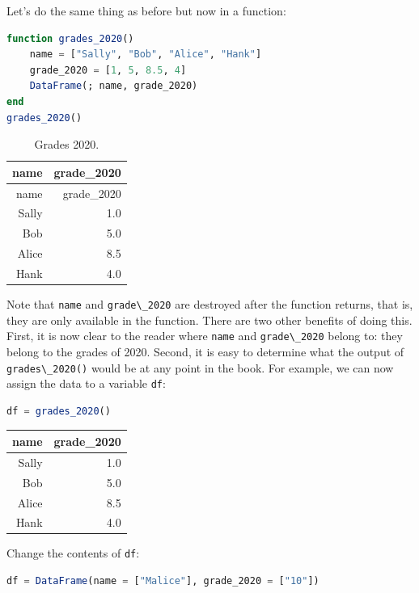 \documentclass[
  notoc %
]{tufte-book}
\newcommand{\passthrough}[1]{#1}
\begin{document}
Let's do the same thing as before but now in a function:

\begin{lstlisting}[language=Julia]
function grades_2020()
    name = ["Sally", "Bob", "Alice", "Hank"]
    grade_2020 = [1, 5, 8.5, 4]
    DataFrame(; name, grade_2020)
end
grades_2020()
\end{lstlisting}

\hypertarget{tbl:grades_2020}{}
\begin{longtable}[]{@{}rr@{}}
\caption{\label{tbl:grades_2020}Grades 2020.}\tabularnewline
\toprule()
name & grade\_2020 \\
\midrule()
\endfirsthead
\toprule()
name & grade\_2020 \\
\midrule()
\endhead
Sally & 1.0 \\
Bob & 5.0 \\
Alice & 8.5 \\
Hank & 4.0 \\
\bottomrule()
\end{longtable}

Note that \passthrough{\lstinline!name!} and
\passthrough{\lstinline!grade\_2020!} are destroyed after the function
returns, that is, they are only available in the function. There are two
other benefits of doing this. First, it is now clear to the reader where
\passthrough{\lstinline!name!} and \passthrough{\lstinline!grade\_2020!}
belong to: they belong to the grades of 2020. Second, it is easy to
determine what the output of \passthrough{\lstinline!grades\_2020()!}
would be at any point in the book. For example, we can now assign the
data to a variable \passthrough{\lstinline!df!}:

\begin{lstlisting}[language=Julia]
df = grades_2020()
\end{lstlisting}

\begin{longtable}[]{@{}rr@{}}
\toprule()
name & grade\_2020 \\
\midrule()
\endhead
Sally & 1.0 \\
Bob & 5.0 \\
Alice & 8.5 \\
Hank & 4.0 \\
\bottomrule()
\end{longtable}

Change the contents of \passthrough{\lstinline!df!}:

\begin{lstlisting}[language=Julia]
df = DataFrame(name = ["Malice"], grade_2020 = ["10"])
\end{lstlisting}
\end{document}
